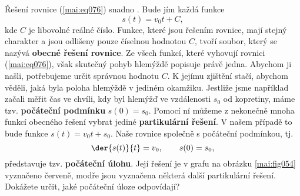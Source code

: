 \begin{mdframed}[style=mdexam]
\begin{example}
    Řešení rovnice (\ref{mai:eq076}) snadno . Bude jím každá funkce
    \begin{equation*}
      s(t) = v_0t +C,
    \end{equation*}
    kde \(C\) je libovolné reálné číslo. Funkce, které jsou řešením rovnice, mají stejný charakter a
    jsou odlišeny pouze číselnou hodnotou \(C\), tvoří soubor, který se nazývá \textbf{obecné řešení
    rovnice}. Ze všech funkcí, které vyhovují rovnici (\ref{mai:eq076}), však skutečný pohyb
    hlemýždě popisuje právě jedna. Abychom ji našli, potřebujeme určit správnou hodnotu \(C\). K
    jejímu zjištění stačí, abychom věděli, jaká byla poloha hlemýždě v jediném okamžiku. Jestliže
    jsme například začali měřit čas ve chvíli, kdy byl hlemýžď ve vzdálenosti \(s_0\) od kopretiny,
    máme tzv. \textbf{počáteční podmínku} \(s(0) = s_0\). Pomocí ní můžeme z nekonečně mnoha funkcí
    obecného řešení vybrat jediné \textbf{partikulární řešení}. V našem případě to bude funkce
    \(s(t) = v_0t + s_0\). Naše rovnice společně s počáteční podmínkou, tj.
    \begin{equation}\label{mai:eq077}
      \der{s(t)}{t} = v_0, \qquad s(0) = s_0,
    \end{equation}
    představuje tzv. \textbf{počáteční úlohu}. Její řešení je v grafu na obrázku \ref{mai:fig054}
    vyznačeno červeně, modře jsou vyznačena některá další partikulární řešení. Dokážete určit, jaké
    počáteční úloze odpovídají?
  \end{example}
\end{mdframed}